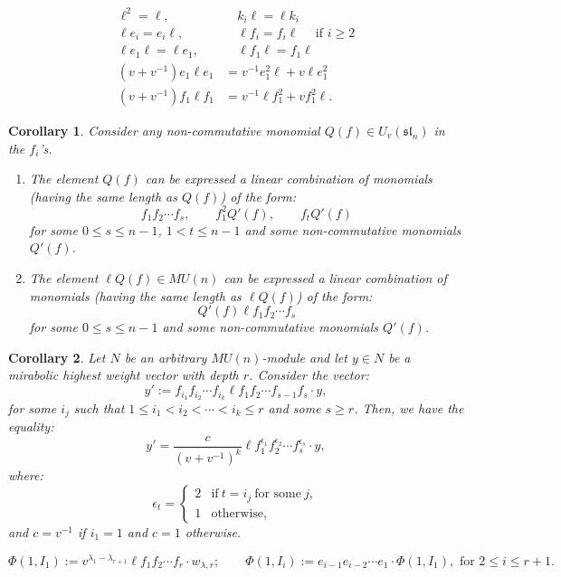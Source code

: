 \documentclass[10pt,a4paper]{amsart}
\newtheorem{corollary}{Corollary}
\newcommand{\eps}{\epsilon}
\newcommand{\sll}{\mathfrak{sl}}
\newcommand{\uvsln}{U_v(\sll_n)}
\begin{document}
\begin{align}\label{eq:mun.1} \ell^2=\ell,&\quad k_i\ell=\ell k_i\\
\label{eq:mun.2} \ell e_i=e_i\ell,&\quad \ell f_i=f_i\ell \quad\text{ if }i\geq 2\\
\label{eq:mun.3} \ell e_1\ell=\ell e_1,&\quad \ell f_1\ell=f_1\ell\\
\label{eq:mun.4} (v+v^{-1})e_1\ell e_1 &= v^{-1}e_1^2\ell + v\ell e_1^2\\
\label{eq:mun.5} (v+v^{-1})f_1\ell f_1 &= v^{-1}\ell f_1^2 + vf_1^2\ell.\end{align}

\begin{corollary} \label{cor:lastcor}
Consider any non-commutative monomial $Q(f)\in \uvsln$ in the $f_i$'s.
\begin{enumerate}
\item The element $Q(f)$ can be expressed a linear combination of monomials (having the same length as $Q(f)$) of the form:
\[f_1f_2\cdots f_s,\qquad f_1^2 Q'(f), \qquad f_t Q'(f)\]
for some $0\leq s\leq n-1$, $1<t\leq n-1$ and some non-commutative monomials $Q'(f)$.
\item The element $\ell Q(f)\in MU(n)$ can be expressed a linear combination of monomials (having the same length as $\ell Q(f)$) of the form:
\[Q'(f)\ell f_1f_2\cdots f_s\]
for some $0\leq s\leq n-1$ and some non-commutative monomials $Q'(f)$.
\end{enumerate}
\end{corollary}

\begin{corollary} \label{cor:fmove}
Let $N$ be an arbitrary $MU(n)$-module and let $y\in N$ be a mirabolic highest weight vector with depth $r$. Consider the vector:
\[y':= f_{i_1} f_{i_2}\cdots f_{i_k}  \ell f_1 f_2\cdots f_{s-1} f_{s} \cdot y,\]
for some $i_j$ such that $1\leq i_1< i_2<\cdots <i_k\leq r$ and some $s\geq r$. Then, we have the equality:
\[y'=  \frac{c}{(v+v^{-1})^k}\ell  f_1^{\eps_1}  f_2^{\eps_2} \cdots f_s^{\eps_s} \cdot y,\]
where:
\[\eps_t=\begin{cases}2 & \text{if}~t=i_j~\text{for some}~j,\\1 &\text{otherwise},\end{cases}\]
and $c=v^{-1}$ if $i_1=1$ and $c=1$ otherwise.
\end{corollary}

\begin{equation}\label{eq:Phi1}\Phi(1,I_1) := v^{\lambda_1-\lambda_{r+1}}\ell f_1f_2\cdots f_r \cdot  w_{\lambda,r};\qquad
\Phi(1,I_i):=e_{i-1}e_{i-2}\cdots e_1\cdot \Phi(1,I_1), \text{ for }2\leq i\leq r+1.\end{equation}%
\end{document}
